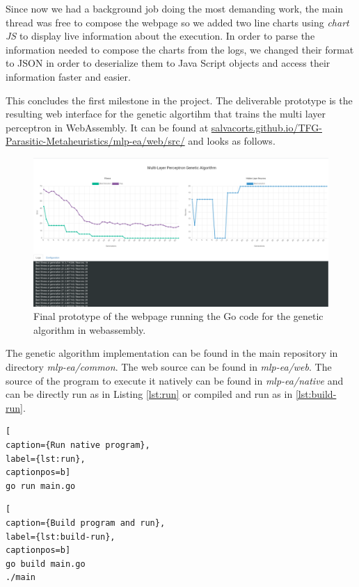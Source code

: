 Since now we had a background job doing the most demanding work, the main thread was free to compose the webpage so we added two line charts using \textit{chart JS} to display live information about the execution. In order to parse the information needed to compose the charts from the logs, we changed their format to JSON in order to deserialize them to Java Script objects and access their information faster and easier.

This concludes the first milestone in the project. The deliverable prototype is the resulting web interface for the genetic algortihm that trains the multi layer perceptron in WebAssembly. It can be found at \href{https://salvacorts.github.io/TFG-Parasitic-Metaheuristics/mlp-ea/web/src/}{salvacorts.github.io/TFG-Parasitic-Metaheuristics/mlp-ea/web/src/} and looks as follows.

\begin{figure}[h!]
		\centering
    	\includegraphics[width=\linewidth]{assets/images/web-milestone1.png}
    	\caption{Final prototype of the webpage running the Go code for the genetic algorithm in webassembly.}
    	\label{image:web-milestone1}
\end{figure}

The genetic algorithm implementation can be found in the main repository in directory \textit{mlp-ea/common}. The web source can be found in \textit{mlp-ea/web}. The source of the program to execute it natively can be found in \textit{mlp-ea/native} and can be directly run as in Listing \ref{lst:run} or compiled and run as in \ref{lst:build-run}.

\begin{lstlisting}[
caption={Run native program},
label={lst:run},
captionpos=b]
go run main.go
\end{lstlisting} 

\begin{lstlisting}[
caption={Build program and run},
label={lst:build-run},
captionpos=b]
go build main.go
./main
\end{lstlisting} 


